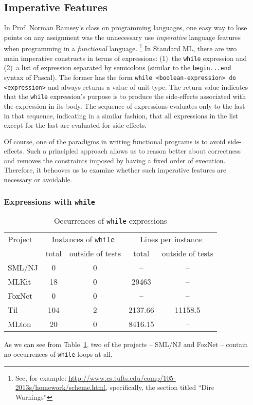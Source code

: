 \documentclass[12pt,abstracton]{scrartcl}
\begin{document}
\subsection{Imperative Features}\label{subsec:imper}
In Prof. Norman Ramsey's class on programming languages, one easy way to lose points
on any assignment was the unnecessary use \emph{imperative} language features when programming in a \emph{functional} language.
\footnote{See, for example: \url{http://www.cs.tufts.edu/comp/105-2013s/homework/scheme.html}, specifically, the section titled ``Dire Warnings''}
In Standard ML, there are two main imperative constructs in terms of expressions:
(1)~the \texttt{while} expression and (2)~a list of expression separated by semicolons (similar to the \texttt{begin...end} syntax of Pascal)\cite{Ull98}.
The former has the form \texttt{while <boolean-expression> do <expression>} and always returns a value of unit type.
The return value indicates that the \texttt{while} expression's purpose is to produce the side-effects associated
with the expression in its body. The sequence of expressions evaluates only to the last in that sequence, indicating
in a similar fashion, that all expressions in the list except for the last are evaluated for side-effects.

Of course, one of the paradigms in writing functional programs is to avoid side-effects.
Such a principled approach allows us to reason better about correctness and
removes the constraints imposed by having a fixed order of execution.\cite{Hug90} Therefore,
it behooves us to examine whether such imperative features are necessary or avoidable.
\subsubsection{Expressions with \texttt{while}}
\begin{table}[h!]
\centering
\begin{tabular}{|l||c|c||c|c|}
\hline
Project & \multicolumn{2}{c||}{Instances of \texttt{while}} & \multicolumn{2}{c|}{Lines per instance} \\ \cline{2-3}\cline{4-5}
 & total & outside of tests & total & outside of tests \\ \hline\hline
SML/NJ & 0 & 0 & -- & --\\ 
MLKit & 18 & 0 & 29463 & --\\
FoxNet & 0 & 0 & -- & -- \\
Til & 104 & 2 & 2137.66 & 11158.5 \\
MLton & 20 & 0 & 8416.15 & --\\ \hline
\end{tabular}
\caption{Occurrences of \texttt{while} expressions}
\label{table:while}
\end{table}
As we can see from Table~\ref{table:while}, two of the projects -- SML/NJ and FoxNet -- contain no occurrences
of \texttt{while} loops at all.
\end{document}
